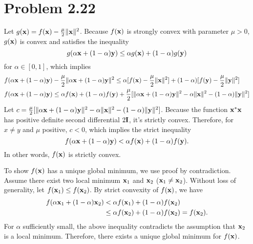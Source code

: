 \documentclass{scrartcl}
\begin{document}
\section*{Problem 2.22}

Let $g(\mathbf{x}) = f(\mathbf{x})-{\mu \over 2}\|\mathbf{x}\|^2$.
Because $f(\mathbf{x})$ is strongly convex with parameter $\mu > 0$,
$g(\mathbf{x})$ is convex and satisfies the inequality
\begin{equation}
	g(\alpha \mathbf{x} + (1-\alpha)\mathbf{y}) \le \alpha g(\mathbf{x}) + (1-\alpha)g(\mathbf{y})
\end{equation}
for $\alpha \in [0, 1]$, which implies
\begin{equation}
	\begin{split}
	& f(\alpha \mathbf{x} + (1-\alpha)\mathbf{y})-{\mu \over 2} \|\alpha \mathbf{x} + (1-\alpha)\mathbf{y} \|^2
	\le \alpha [f(\mathbf{x}) - {\mu \over 2}\|\mathbf{x}\|^2] + (1-\alpha)[f(\mathbf{y}) - {\mu \over 2}\|\mathbf{y}\|^2] \\
	& f(\alpha \mathbf{x} + (1-\alpha)\mathbf{y}) \le \alpha f(\mathbf{x}) + (1-\alpha)f(\mathbf{y})
	+ {\mu \over 2}[\|\alpha \mathbf{x} + (1-\alpha)\mathbf{y} \|^2-\alpha\|\mathbf{x}\|^2-(1-\alpha)\|\mathbf{y}\|^2]
	\end{split}
\end{equation}
Let $c = {\mu \over 2}[\|\alpha \mathbf{x} + (1-\alpha)\mathbf{y} \|^2-\alpha\|\mathbf{x}\|^2-(1-\alpha)\|\mathbf{y}\|^2] $.
Because the function $\mathbf{x}^*\mathbf{x}$ has positive definite second differential $2\mathbf{I}$, it's
strictly convex. Therefore, for $x \ne y$ and $\mu$ positive, $c < 0$, which implies the
strict inequality
\begin{equation}
f(\alpha \mathbf{x} + (1-\alpha)\mathbf{y}) < \alpha f(\mathbf{x}) + (1-\alpha)f(\mathbf{y}) .
\end{equation}
In other words, $f(\mathbf{x})$ is strictly convex.

To show $f(\mathbf{x})$ has a unique global minimum, we use proof by contradiction.
Assume there exist two local minimum $\mathbf{x}_1$ and $\mathbf{x}_2$ ($\mathbf{x}_1 \ne \mathbf{x}_2$).
Without loss of generality, let $f(\mathbf{x}_1) \le f(\mathbf{x}_2)$.
By strict convexity of $f(\mathbf{x})$, we have
\begin{equation}
	\begin{split}
	f(\alpha \mathbf{x}_1 + (1-\alpha) \mathbf{x}_2)
	& < \alpha f(\mathbf{x}_1) + (1-\alpha) f(\mathbf{x}_2) \\
	& \le \alpha f(\mathbf{x}_2) + (1-\alpha) f(\mathbf{x}_2)
	= f(\mathbf{x}_2).
	\end{split}
\end{equation}
For $\alpha$ sufficiently small, the above inequality contradicts the assumption that
$\mathbf{x}_2$ is a local minimum.
Therefore, there exists a unique global minimum for $f(\mathbf{x})$.
\end{document}
